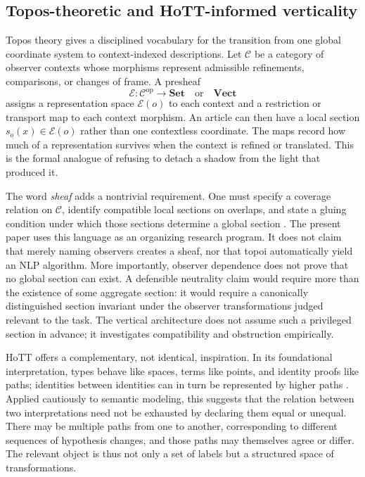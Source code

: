 \subsection{Topos-theoretic and HoTT-informed verticality}

Topos theory gives a disciplined vocabulary for the transition from one global coordinate system to context-indexed descriptions. Let \(\mathcal{C}\) be a category of observer contexts whose morphisms represent admissible refinements, comparisons, or changes of frame. A presheaf
\begin{equation}
    \mathcal{E}\colon\mathcal{C}^{\mathrm{op}}
    \longrightarrow \mathbf{Set}
    \quad\text{or}\quad \mathbf{Vect}
    \label{eq:presheaf}
\end{equation}
assigns a representation space \(\mathcal{E}(o)\) to each context and a restriction or transport map to each context morphism. An article can then have a local section \(s_o(x)\in\mathcal{E}(o)\) rather than one contextless coordinate. The maps record how much of a representation survives when the context is refined or translated. This is the formal analogue of refusing to detach a shadow from the light that produced it.

The word \emph{sheaf} adds a nontrivial requirement. One must specify a coverage relation on \(\mathcal{C}\), identify compatible local sections on overlaps, and state a gluing condition under which those sections determine a global section \citep{maclanemoerdijk1992}. The present paper uses this language as an organizing research program. It does not claim that merely naming observers creates a sheaf, nor that topoi automatically yield an NLP algorithm. More importantly, observer dependence does not prove that no global section can exist. A defensible neutrality claim would require more than the existence of some aggregate section: it would require a canonically distinguished section invariant under the observer transformations judged relevant to the task. The vertical architecture does not assume such a privileged section in advance; it investigates compatibility and obstruction empirically.

HoTT offers a complementary, not identical, inspiration. In its foundational interpretation, types behave like spaces, terms like points, and identity proofs like paths; identities between identities can in turn be represented by higher paths \citep{hottbook2013}. Applied cautiously to semantic modeling, this suggests that the relation between two interpretations need not be exhausted by declaring them equal or unequal. There may be multiple paths from one to another, corresponding to different sequences of hypothesis changes, and those paths may themselves agree or differ. The relevant object is thus not only a set of labels but a structured space of transformations.


